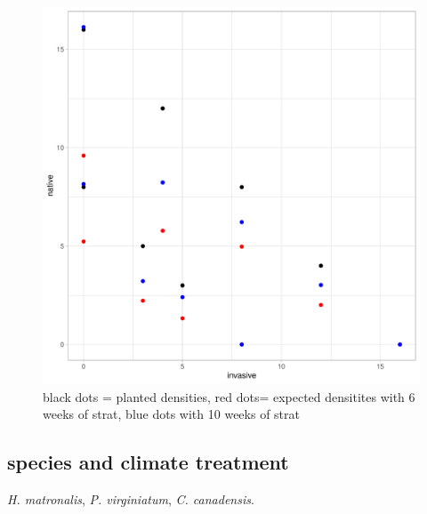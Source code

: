 \documentclass{article}\usepackage[]{graphicx}\usepackage[]{color}
\makeatletter
\def\maxwidth{ %
  \ifdim\Gin@nat@width>\linewidth
    \linewidth
  \else
    \Gin@nat@width
  \fi
}
\newenvironment{knitrout}{}{} %
\makeatother
\begin{document}
\begin{figure}
\begin{knitrout}
\color{fgcolor}
\includegraphics[width=\maxwidth]{figure/unnamed-chunk-1-1} 

\end{knitrout}
\caption{black dots = planted densities, red dots= expected densitites with 6 weeks of strat, blue dots with 10 weeks of strat}
\end{figure}
\subsection{species and climate treatment}
\textit{H. matronalis}, \textit{P. virginiatum}, \textit{C. canadensis}.\\
\end{document}
